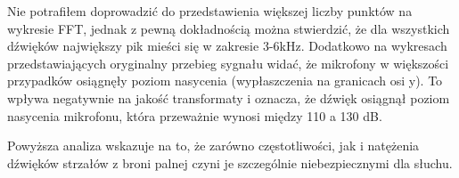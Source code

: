 Nie potrafiłem doprowadzić do przedstawienia większej liczby punktów na wykresie FFT, jednak z pewną dokładnością można stwierdzić, że dla wszystkich dźwięków największy pik mieści się w zakresie 3-6kHz. Dodatkowo na wykresach przedstawiających oryginalny przebieg sygnału widać, że mikrofony w większości przypadków osiągnęły poziom nasycenia (wypłaszczenia na granicach osi y). To wpływa negatywnie na jakość transformaty i oznacza, że dźwięk osiągnął poziom nasycenia mikrofonu, która przeważnie wynosi między 110 a 130 dB. 

Powyższa analiza wskazuje na to, że zarówno częstotliwości, jak i natężenia dźwięków strzałów z broni palnej czyni je szczególnie niebezpiecznymi dla słuchu.
